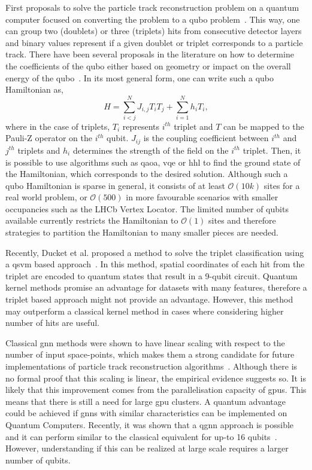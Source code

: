 First proposals to solve the particle track reconstruction problem on a quantum computer focused on converting the problem to a \gls{qubo} problem~\cite{bapst_pattern_2019, zlokapa2021}. This way, one can group two (doublets) or three (triplets) hits from consecutive detector layers and binary values represent if a given doublet or triplet corresponds to a particle track. 
There have been several proposals in the literature on how to determine the coefficients of the \gls{qubo} either based on geometry or impact on the overall energy of the \gls{qubo}~\cite{Funcke:2022dws, schwaegerl2023particle, Crippa:2023ieq}. In its most general form, one can write such a \gls{qubo} Hamiltonian as,
\[H=\sum_{i < j}^{N} J_{i,j}T_iT_j + \sum_{i=1}^{N}h_iT_i, \]
where in the case of triplets, $T_i$ represents $i^{th}$ triplet and $T$ can be mapped to the Pauli-Z operator on the $i^{th}$ qubit. $J_{ij}$ is the coupling coefficient between $i^{th}$ and $j^{th}$ triplets and $h_i$ determines the strength of the field on the $i^{th}$ triplet. Then, it is possible to use algorithms such as \gls{qaoa}, \gls{vqe} or \gls{hhl} to find the ground state of the Hamiltonian, which corresponds to the desired solution. Although such a \gls{qubo} Hamiltonian is sparse in general, it consists of at least $\mathcal{O}(10k)$ sites for a real world problem, or $\mathcal{O}(500)$ in more favourable scenarios with smaller occupancies such as the LHCb Vertex Locator. The limited number of qubits available currently restricts the Hamiltonian to $\mathcal{O}(1)$ sites and therefore strategies to partition the Hamiltonian to many smaller pieces are needed.

Recently, Ducket et al. proposed a method to solve the triplet classification using a \gls{qsvm} based approach~\cite{duckett_reconstructing_2022}. In this method, spatial coordinates of each hit from the triplet are encoded to quantum states that result in a 9-qubit circuit. Quantum kernel methods promise an advantage for datasets with many features, therefore a triplet based approach might not provide an advantage. However, this method may outperform a classical kernel method in cases where considering higher number of hits are useful.

Classical \gls{gnn} methods were shown to have linear scaling with respect to the number of input space-points, which makes them a strong candidate for future implementations of particle track reconstruction algorithms~\cite{ju_performance_2021}. Although there is no formal proof that this scaling is linear, the empirical evidence suggests so. It is likely that this improvement comes from the parallelisation capacity of \gls{gpu}s. This means that there is still a need for large \gls{gpu} clusters. A quantum advantage could be achieved if \gls{gnn}s with similar characteristics can be implemented on Quantum Computers. Recently, it was shown that a \gls{qgnn} approach is possible and it can perform similar to the classical equivalent for up-to 16 qubits~\cite{tuysuz21, QGNN-embedding}. However, understanding if this can be realized at large scale requires a larger number of qubits. 

